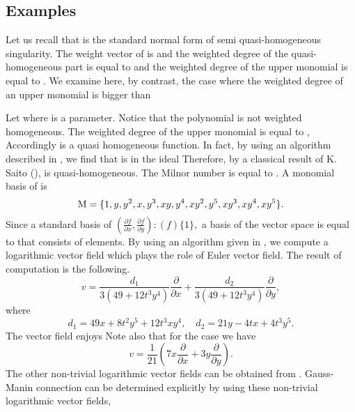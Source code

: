 \documentclass{arxsigma}
\begin{document}
\subsection{Examples}
Let us recall that   is the standard normal form of semi quasi-homogeneous
  singularity. The weight vector of
is   and the weighted degree of the quasi-homogeneous part is equal to   and the weighted degree of the upper monomial   is equal to  . We examine here, by contrast, the case where the weighted degree of an upper monomial is bigger than  
\begin{example}
Let   where   is a parameter. Notice that the polynomial   is not weighted homogeneous. The weighted degree of the upper monomial
  is equal to  , Accordingly   is a quasi homogeneous function. In fact, by using an algorithm described in \cite{NT16a,T14}, we find that
  is in the ideal   Therefore, by a classical result of K. Saito (\cite{S71}),   is
quasi-homogeneous. The Milnor number   is equal to  .
A monomial basis   of
  is
\begin{equation*}{\rm M} = \{1, y, y^2, x, y^3, xy, y^4, xy^2, y^5, xy^3, xy^4, xy^5 \}.
\end{equation*}
Since a standard basis   of $ (\frac{\partial f}{\partial x}, \frac{\partial f}{\partial y}) : (f)
  \{ 1 \},$
a basis   of the vector space
  is
equal to   that consists of   elements.
By using an algorithm given in \cite{NT16b}, we compute
a logarithmic vector field which plays the role of Euler vector field.
The result of computation is the following.
\begin{equation*}
v= \frac{d_1}{3(49+12t^3y^4)}\frac{\partial}{\partial x} + \frac{d_2}{3(49+12t^3y^4)}\frac{\partial}{\partial y},
\end{equation*}
where
\begin{equation*}
d_1=49x+8t^2y^5+12t^3xy^4, \quad d_2=21y-4tx+4t^3y^5.
\end{equation*}
The vector field   enjoys
  Note also that for the case   we have
\begin{equation*}
v= \frac{1}{21}\left(7x\frac{\partial}{\partial x} + 3y\frac{\partial}{\partial y}\right). \end{equation*}
The other non-trivial logarithmic vector fields can be obtained from  . Gauss-Manin connection can be determined explicitly by using these non-trivial logarithmic vector fields,
\end{example}
\end{document}
